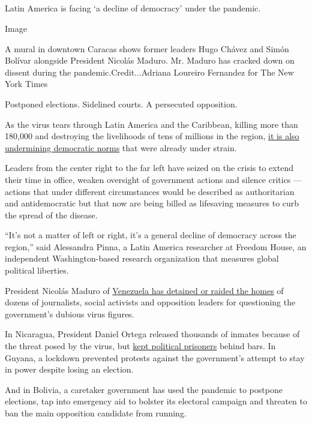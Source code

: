 \hypertarget{-8}{%
\subsection{}\label{-8}}

Latin America is facing `a decline of democracy' under the pandemic.

Image

A mural in downtown Caracas shows former leaders Hugo Chávez and Simón
Bolívar alongside President Nicolás Maduro. Mr. Maduro has cracked down
on dissent during the pandemic.Credit...Adriana Loureiro Fernandez for
The New York Times

Postponed elections. Sidelined courts. A persecuted opposition.

As the virus tears through Latin America and the Caribbean, killing more
than 180,000 and destroying the livelihoods of tens of millions in the
region,
\href{https://www.nytimes.com/2020/07/29/world/americas/latin-america-democracy-pandemic.html}{it
is also undermining democratic norms} that were already under strain.

Leaders from the center right to the far left have seized on the crisis
to extend their time in office, weaken oversight of government actions
and silence critics --- actions that under different circumstances would
be described as authoritarian and antidemocratic but that now are being
billed as lifesaving measures to curb the spread of the disease.

``It's not a matter of left or right, it's a general decline of
democracy across the region,'' said Alessandra Pinna, a Latin America
researcher at Freedom House, an independent Washington-based research
organization that measures global political liberties.

President Nicolás Maduro of
\href{https://www.nytimes.com/2020/06/19/world/americas/venezuela-forced-disappearances-Maduro.html}{Venezuela
has detained or raided the homes} of dozens of journalists, social
activists and opposition leaders for questioning the government's
dubious virus figures.

In Nicaragua, President Daniel Ortega released thousands of inmates
because of the threat posed by the virus, but
\href{https://www.barrons.com/news/nicaragua-excludes-political-prisoners-from-mass-release-01586430304}{kept
political prisoners} behind bars. In Guyana, a lockdown prevented
protests against the government's attempt to stay in power despite
losing an election.

And in Bolivia, a caretaker government has used the pandemic to postpone
elections, tap into emergency aid to bolster its electoral campaign and
threaten to ban the main opposition candidate from running.

